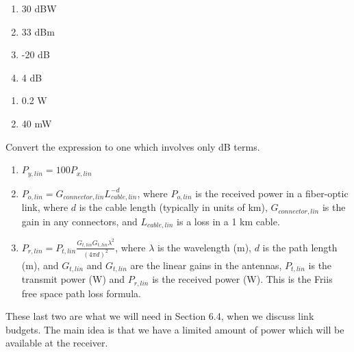 \begin{enumerate}
 \item 30 dBW
 \item 33 dBm
 \item -20 dB
 \item 4 dB
\end{enumerate}

\begin{enumerate}
 \item 0.2 W
 \item 40 mW
\end{enumerate}
  Convert the expression to one which involves only dB terms.
\begin{enumerate}
 \item $P_{y,lin} = 100 P_{x,lin}$
 \item $P_{o,lin} = G_{connector,lin} L_{cable,lin}^{-d}$, where $P_{o,lin}$ is the received power in a fiber-optic link, where $d$ is the cable length (typically in units of km), $G_{connector,lin}$ is the gain in any connectors, and $L_{cable,lin}$ is a loss in a 1 km cable.
 \item $P_{r,lin} = P_{t,lin} \frac{G_{t,lin} G_{t,lin} \lambda^2}{(4\pi d)^2}$, where $\lambda$ is the wavelength (m), $d$ is the path length (m), and $G_{t,lin}$ and $G_{t,lin}$ are the linear gains in the antennas, $P_{t,lin}$ is the transmit power (W) and $P_{r,lin}$ is the received power (W).  This is the Friis free space path loss formula.
\end{enumerate}

These last two are what we will need in Section 6.4, when we discuss link budgets.  The main idea is that we have a limited amount of power which will be available at the receiver.



